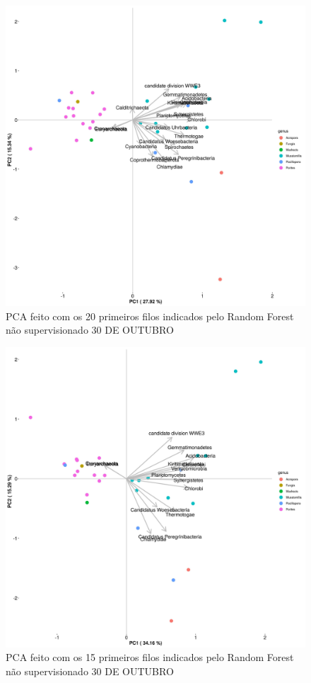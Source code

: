 \documentclass[12pt, a4paper]{report}
\begin{document}
\begin{figure}[H]
\centering
\includegraphics[scale=0.3]{figures/filos/pca_corais_mgrast_rf_nao_supervisionado_20_filos_30_10_2018.jpg}
\caption{PCA feito com os 20 primeiros filos indicados pelo Random Forest não supervisionado 30 DE OUTUBRO}
\label{fig:PCAcom20filosderivadodoRfnaosupervisionadofeito30deoutubro}
\end{figure}

\begin{figure}[H]
\centering
\includegraphics[scale=0.3]{figures/filos/pca_corais_mgrast_rf_nao_supervisionado_15_filos_30_10_2018.jpg}
\caption{PCA feito com os 15 primeiros filos indicados pelo Random Forest não supervisionado 30 DE OUTUBRO}
\label{fig:PCAcom15filosderivadodoRfnaosupervisionadofeito30deoutubro}
\end{figure}
\end{document}
